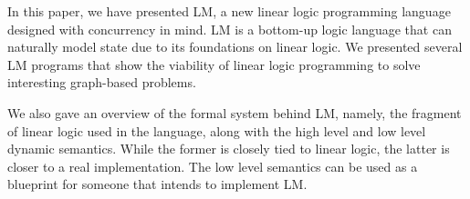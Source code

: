In this paper, we have presented LM, a new linear logic programming language designed with concurrency in mind. LM is a bottom-up logic language
that can naturally model state due to its foundations on linear logic.
We presented several LM programs that show the viability of linear logic programming to solve interesting graph-based problems.

We also gave an overview of the formal system behind LM, namely, the fragment of linear logic used in the language, along with the high level and low level dynamic semantics.
While the former is closely tied to linear logic, the latter is closer to a real implementation.
The low level semantics can be used as a blueprint for someone that intends to implement LM.
